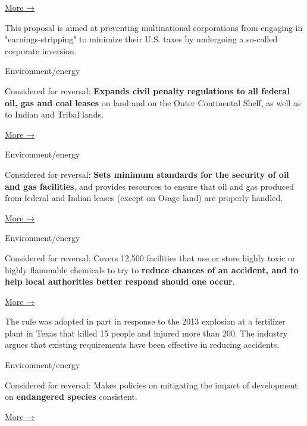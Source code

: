 \href{https://www.federalregister.gov/documents/2016/10/21/2016-25105/treatment-of-certain-interests-in-corporations-as-stock-or-indebtedness}{More
→}

This proposal is aimed at preventing multinational corporations from
engaging in "earnings-stripping" to minimize their U.S. taxes by
undergoing a so-called corporate inversion.

Environment/energy

Considered for reversal: \textbf{Expands civil penalty regulations to
all federal oil, gas and coal leases} on land and on the Outer
Continental Shelf, as well as to Indian and Tribal lands.

\href{https://www.federalregister.gov/documents/2016/08/01/2016-17598/amendments-to-civil-penalty-regulations}{More
→}

Environment/energy

Considered for reversal: \textbf{Sets minimum standards for the security
of oil and gas facilities}, and provides resources to ensure that oil
and gas produced from federal and Indian leases (except on Osage land)
are properly handled.

\href{https://www.federalregister.gov/documents/2016/11/17/2016-25407/onshore-oil-and-gas-operations-federal-and-indian-oil-and-gas-leases-site-security}{More
→}

Environment/energy

Considered for reversal: Covers 12,500 facilities that use or store
highly toxic or highly flammable chemicals to try to \textbf{reduce
chances of an accident, and to help local authorities better respond
should one occur}.

\href{https://www.federalregister.gov/documents/2017/03/16/2017-05288/accidental-release-prevention-requirements-risk-management-programs-under-the-clean-air-act-further}{More
→}

The rule was adopted in part in response to the 2013 explosion at a
fertilizer plant in Texas that killed 15 people and injured more than
200​. The industry argues that existing requirements have been effective
in reducing accidents.

Environment/energy

Considered for reversal: Makes policies on mitigating the impact of
development on \textbf{endangered species} consistent.

\href{https://www.federalregister.gov/documents/2016/12/27/2016-30929/endangered-and-threatened-wildlife-and-plants-endangered-species-act-compensatory-mitigation-policy}{More
→}

